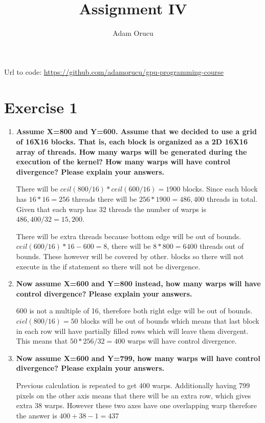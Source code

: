 \documentclass[a4paper,11pt]{scrartcl}
\title{Assignment IV}
\author{Adam Orucu}
\begin{document}
\maketitle

Url to code: \url{https://github.com/adamorucu/gpu-programming-course}

\section*{Exercise 1}

\begin{enumerate}
    \item \textbf{Assume X=800 and Y=600. Assume that we decided to use a grid of 16X16 blocks. That is, each block is organized as a 2D 16X16 array of threads. How many warps will be generated during the execution of the kernel? How many warps will have control divergence? Please explain your answers.}

    There will be $ceil(800/16) * ceil(600/16) = 1900$ blocks. Since each block has $16*16=256$ threads there will be $256 * 1900 = 486,400$ threads in total. Given that each warp has 32 threads the number of warps is $486,400 / 32 = 15,200$.

    There will be extra threads because bottom edge will be out of bounds. $ceil(600/16)*16-600=8$, there will be $8*800=6400$ threads out of bounds. These however will be covered by other. blocks so there will not execute in the if statement so there will not be divergence.

    \item \textbf{Now assume X=600 and Y=800 instead, how many warps will have control divergence? Please explain your answers.}
    
    600 is not a multiple of 16, therefore both right edge will be out of bounds. $ciel(800/16) = 50$ blocks will be out of bounds which means that last block in each row will have partially filled rows which will leave them divergent. This means that $50*256/32= 400$ warps will have control divergence.

    \item \textbf{Now assume X=600 and Y=799, how many warps will have control divergence? Please explain your answers.}

    Previous calculation is repeated to get 400 warps. Additionally having 799 pixels on the other axis means that there will be an extra row, which gives extra 38 warps. However these two axes have one overlapping warp therefore the answer is $400 + 38 - 1 = 437$

\end{enumerate}
\end{document}
